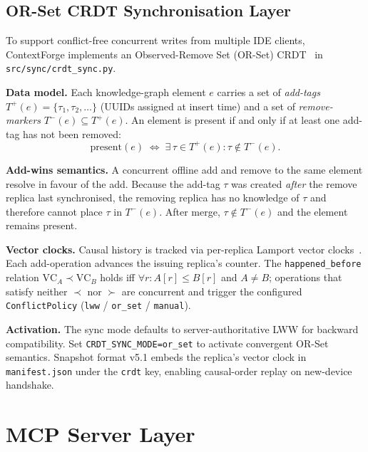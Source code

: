 \documentclass[11pt,twocolumn]{article}
\begin{document}
\subsection{OR-Set CRDT Synchronisation Layer}
\label{sec:crdt}

To support conflict-free concurrent writes from multiple IDE clients, ContextForge
implements an Observed-Remove Set (OR-Set) CRDT~\cite{shapiro2011} in
\texttt{src/sync/crdt\_sync.py}.

\textbf{Data model.}
Each knowledge-graph element $e$ carries a set of \emph{add-tags}
$T^{+}(e) = \{\tau_1, \tau_2, \ldots\}$ (UUIDs assigned at insert time) and a
set of \emph{remove-markers} $T^{-}(e) \subseteq T^{+}(e)$.
An element is present if and only if at least one add-tag has not been removed:
\begin{equation}
  \text{present}(e) \;\iff\; \exists\,\tau \in T^{+}(e) : \tau \notin T^{-}(e).
  \label{eq:orset}
\end{equation}

\textbf{Add-wins semantics.}
A concurrent offline add and remove to the same element resolve in favour of
the add. Because the add-tag $\tau$ was created \emph{after} the remove
replica last synchronised, the removing replica has no knowledge of $\tau$ and
therefore cannot place $\tau$ in $T^{-}(e)$. After merge, $\tau \notin T^{-}(e)$
and the element remains present.

\textbf{Vector clocks.}
Causal history is tracked via per-replica Lamport vector
clocks~\cite{lamport1978}. Each add-operation advances the issuing replica's
counter. The \texttt{happened\_before} relation
$\mathrm{VC}_{A} \prec \mathrm{VC}_{B}$ holds iff
$\forall r: A[r] \leq B[r]$ and $A \neq B$; operations that satisfy neither
$\prec$ nor $\succ$ are concurrent and trigger the configured
\texttt{ConflictPolicy} (\texttt{lww} / \texttt{or\_set} / \texttt{manual}).

\textbf{Activation.}
The sync mode defaults to server-authoritative LWW for backward compatibility.
Set \texttt{CRDT\_SYNC\_MODE=or\_set} to activate convergent OR-Set semantics.
Snapshot format v5.1 embeds the replica's vector clock in
\texttt{manifest.json} under the \texttt{crdt} key, enabling causal-order
replay on new-device handshake.

\section{MCP Server Layer}
\label{sec:mcp}
\end{document}
